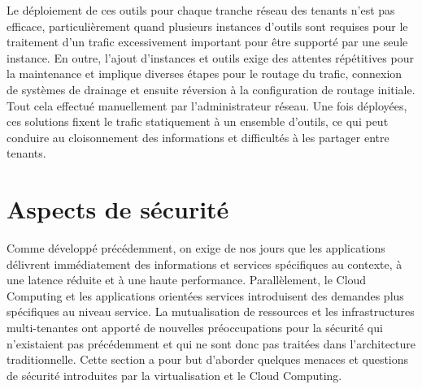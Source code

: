 Le déploiement de ces outils pour chaque tranche réseau des tenants n'est pas efficace, particulièrement quand plusieurs instances d'outils sont requises pour le traitement d'un trafic excessivement important pour être supporté par une seule instance. En outre, l'ajout d'instances et outils exige des attentes répétitives pour la maintenance et implique diverses étapes pour le routage du trafic, connexion de systèmes de drainage et ensuite réversion à la configuration de routage initiale. Tout cela effectué manuellement par l'administrateur réseau. Une fois déployées, ces solutions fixent le trafic statiquement à un ensemble d'outils, ce qui peut conduire au cloisonnement des informations et difficultés à les partager entre tenants. \cite{bigSwitchTapModernDC}  \cite{cloudReadyNetworkJuniper}







\section{Aspects de sécurité}

Comme développé précédemment, on exige de nos jours que les applications délivrent immédiatement des informations et services spécifiques au contexte, à une latence réduite et à une haute performance. Parallèlement, le Cloud Computing et les applications orientées services introduisent des demandes plus spécifiques au niveau service. La mutualisation de ressources et les infrastructures multi-tenantes ont apporté de nouvelles préoccupations pour la sécurité qui n'existaient pas précédemment et qui ne sont donc pas traitées dans l'architecture traditionnelle. Cette section a pour but d'aborder quelques menaces et questions de sécurité introduites par la virtualisation et le Cloud Computing.

